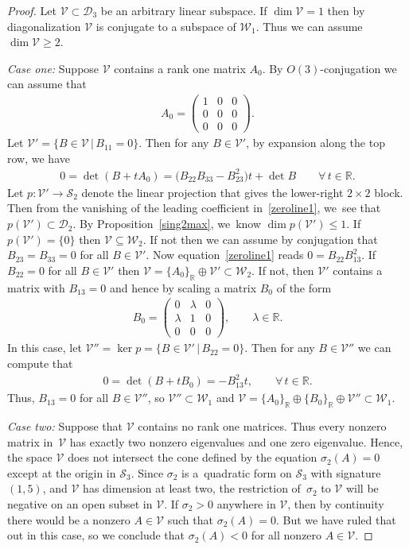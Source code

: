 \documentclass[pdftex]{sigma}
\def\R{\mathbb{R}}
\def\calS{\mathcal{S}}
\def\V{\mathscr{V}}
\def\W{\mathscr{W}}
\def\D{\mathcal{D}}
\numberwithin{equation}{section}
\begin{document}
\begin{proof}
Let $\V \subset \D_3$ be an arbitrary linear subspace. If $\dim \V=1$ then by diagonalization $\V$ is conjugate to a subspace of $\W_1$. Thus we can assume $\dim \V \ge 2$.

\emph{Case one:} Suppose $\V$ contains a rank one matrix $A_0$. By $O(3)$-conjugation we can assume that
\begin{gather*} %
A_0 = \begin{pmatrix} 1 & 0 & 0 \\ 0 & 0 & 0 \\ 0 & 0 & 0 \end{pmatrix} .
\end{gather*}
Let $\V' = \{ B \in \V \,|\, B_{11}=0\}$. Then for any $B \in \V'$, by expansion along the top row, we have
\begin{gather} \label{zeroline1}
0 = \det(B+ t A_0) = \big(B_{22}B_{33}-B_{23}^2\big) t + \det B \qquad
\forall\, t \in \R.
\end{gather}
Let $p\colon \V' \to \calS_2$ denote the linear projection that gives the lower-right $2\times 2$ block. Then from the vanishing of the leading coefficient in~\eqref{zeroline1}, we~see that $p(\V') \subset \D_2$. By Proposition~\ref{sing2max}, we~know $\dim p(\V') \leq 1$. If $p(\V') = \{ 0 \}$ then $\V \subseteq \W_2$. If not then we can assume by conjugation that $B_{23}=B_{33}=0$ for all $B\in \V'$. Now equation~\eqref{zeroline1} reads $0 = B_{22} B_{13}^2$. If $B_{22}=0$ for all $B \in \V'$ then $\V = \{ A_0 \}_\R \oplus \V' \subset \W_2$. If not, then $\V'$ contains a matrix with $B_{13} = 0$ and hence by scaling a matrix $B_0$ of the form
\begin{gather*}
B_0 = \begin{pmatrix} 0 & \lambda & 0 \\ \lambda & 1 & 0 \\ 0 & 0 & 0 \end{pmatrix} ,\qquad \lambda \in \R.
\end{gather*}
In this case, let $\V'' = \ker p = \{ B \in \V' \,|\, B_{22}=0 \}.$ Then for any $B \in \V''$ we can compute that
\begin{gather*}
0 = \det (B + t B_0) = - B_{13}^2 t, \qquad\forall\, t \in \R.
\end{gather*}
Thus, $B_{13} = 0$ for all $B \in \V''$, so $\V'' \subset \W_1$ and $\V = \{ A_0 \}_\R \oplus \{ B_0 \}_\R \oplus \V'' \subset \W_1$.

\emph{Case two:} Suppose that $\V$ contains no rank one matrices. Thus every nonzero matrix in~$\V$ has exactly two nonzero eigenvalues and one zero eigenvalue. Hence, the space $\V$ does not intersect the cone defined by the equation $\sigma_2(A)=0$ except at the origin in $\calS_3$. Since $\sigma_2$ is a~quadratic form on $\calS_3$ with signature $(1,5)$, and $\V$ has dimension at least two, the restriction of~$\sigma_2$ to $\V$ will be negative on an open subset in $\V$. If $\sigma_2 > 0$ anywhere in $\V$, then by continuity there would be a nonzero $A \in \V$ such that $\sigma_2(A) = 0$. But we have ruled that out in this case, so we conclude that $\sigma_2(A) < 0$ for all nonzero $A \in \V$.


\end{proof}
\end{document}
